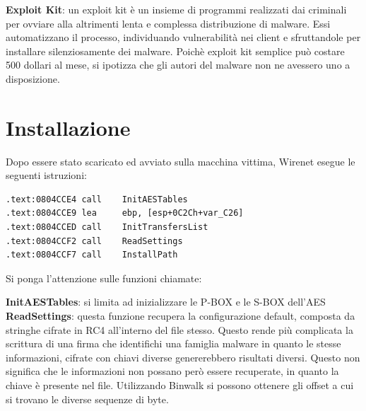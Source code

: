 \documentclass[12pt,oneside]{fithesis2}
\begin{document}
        \textbf{Exploit Kit}: un exploit kit è un insieme di programmi realizzati dai criminali per ovviare alla altrimenti lenta e complessa distribuzione di malware. Essi automatizzano il processo, individuando vulnerabilità nei client e sfruttandole per installare silenziosamente dei malware. Poichè exploit kit semplice può costare 500 dollari al mese, si ipotizza che gli autori del malware non ne avessero uno a disposizione. %
        \clearpage
        
        \section*{Installazione}
        Dopo essere stato scaricato ed avviato sulla macchina vittima, Wirenet esegue le seguenti istruzioni:
        \begin{verbatim}
.text:0804CCE4 call    InitAESTables
.text:0804CCE9 lea     ebp, [esp+0C2Ch+var_C26]
.text:0804CCED call    InitTransfersList
.text:0804CCF2 call    ReadSettings
.text:0804CCF7 call    InstallPath
        \end{verbatim}
        Si ponga l'attenzione sulle funzioni chiamate:
        
        \textbf{InitAESTables}: si limita ad inizializzare le P-BOX e le S-BOX dell'AES
        \textbf{ReadSettings}: questa funzione recupera la configurazione default, composta da stringhe cifrate in RC4 all'interno del file stesso. Questo rende più complicata la scrittura di una firma che identifichi una famiglia malware in quanto le stesse informazioni, cifrate con chiavi diverse genererebbero risultati diversi.
        Questo non significa che le informazioni non possano però essere recuperate, in quanto la chiave è presente nel file. Utilizzando Binwalk si possono ottenere gli offset a cui si trovano le diverse sequenze di byte.
            
\end{document}
